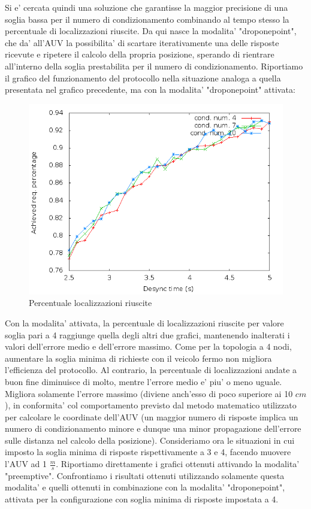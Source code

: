 Si e' cercata quindi una soluzione che garantisse la maggior precisione di una soglia bassa per il numero di condizionamento combinando al tempo stesso la percentuale di localizzazioni riuscite.
Da qui nasce la modalita' "droponepoint", che da' all'AUV la possibilita' di scartare iterativamente una delle risposte ricevute e ripetere il calcolo della propria posizione, sperando di rientrare all'interno della soglia prestabilita per il numero di condizionamento. Riportiamo il grafico del funzionamento del protocollo nella situazione analoga a quella presentata nel grafico precedente, ma con la modalita' "droponepoint" attivata:
\begin{figure}[H]
    \centering
    \includegraphics[scale=0.5]{hexagonsimulation/achievedlocreq3preempt0drop1speed0.png}
    \caption{Percentuale localizzazioni riuscite}
    \label{fig:hexagonsimulation/achievedlocreq3preempt0drop1speed0}
\end{figure}
Con la modalita' attivata, la percentuale di localizzazioni riuscite per valore soglia pari a 4 raggiunge quella degli altri due grafici, mantenendo inalterati i valori dell'errore medio e dell'errore massimo. 
Come per la topologia a 4 nodi, aumentare la soglia minima di richieste con il veicolo fermo non migliora l'efficienza del protocollo. Al contrario, la percentuale di localizzazioni andate a buon fine diminuisce di molto, mentre l'errore medio e' piu' o meno uguale. Migliora solamente l'errore massimo (diviene anch'esso di poco superiore ai 10 $cm$), in conformita' col comportamento previsto dal metodo matematico utilizzato per calcolare le coordinate dell'AUV (un maggior numero di risposte implica un numero di condizionamento minore e dunque una minor propagazione dell'errore sulle distanza nel calcolo della posizione).
Consideriamo ora le situazioni in cui imposto la soglia minima di risposte rispettivamente a 3 e 4, facendo muovere l'AUV ad 1 $\frac{m}{s}$.
Riportiamo direttamente i grafici ottenuti attivando la modalita' "preemptive". Confrontiamo i risultati ottenuti utilizzando solamente questa modalita' e quelli ottenuti in combinazione con la modalita' "droponepoint", attivata per la configurazione con soglia minima di risposte impostata a 4.


